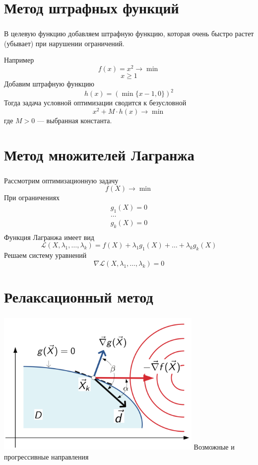 \documentclass{beamer}
\begin{document}
\section{Метод штрафных функций}
\begin{frame}
	\frametitle{\insertsection}
	
    В целевую функцию добавляем штрафную функцию, которая очень быстро растет (убывает) при нарушении ограничений.
    
    Например
    $$f(x) = x^2 \to \min$$
    $$x \geq 1$$
    Добавим штрафную функцию $$h(x) = (\min\{x-1, 0\})^2$$
    Тогда задача условной оптимизации сводится к безусловной
    $$x^2 + M \cdot h(x) \to \min$$ где $M>0$ — выбранная константа.
	
\end{frame}

\section{Метод множителей Лагранжа}
\begin{frame}
	\frametitle{\insertsection}
	
	Рассмотрим оптимизационную задачу
	$$f(X) \to \min$$
	При ограничениях
	$$\begin{matrix}
	g_1(X) = 0\\
	\dots \\
	g_k(X) = 0 \\
	\end{matrix}$$
	Функция Лагранжа имеет вид
	$$\mathcal L(X, \lambda_1, \dots, \lambda_k) = f(X) + \lambda_1g_1(X) + \dots + \lambda_kg_k(X)$$
	Решаем систему уравнений
	$$\nabla \mathcal L(X, \lambda_1, \dots, \lambda_k) = 0$$
	
\end{frame}

\section{Релаксационный метод}
\begin{frame}
	\frametitle{\insertsection}
	
	\begin{center}
	    \includegraphics[width=10cm]{diagram.png}
	    Возможные и прогрессивные направления
	\end{center}

\end{frame}
\end{document}
